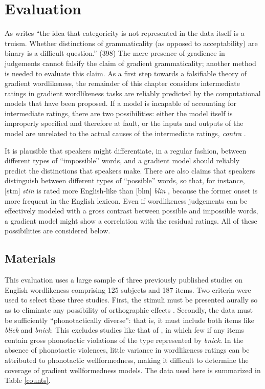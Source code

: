 \section{Evaluation}
\label{2evaluation}

As \citet{Newmeyer2007} writes ``the idea that categoricity is not represented in the data itself is a truism. Whether distinctions of grammaticality (as opposed to acceptability) are binary is a difficult question.'' (398)
The mere presence of gradience in judgements cannot falsify the claim of gradient grammaticality; another method is needed to evaluate this claim.
As a first step towards a falsifiable theory of gradient wordlikeness, the remainder of this chapter considers intermediate ratings in gradient wordlikeness tasks are reliably predicted by the computational models that have been proposed.
If a model is incapable of accounting for intermediate ratings, there are two possibilities: either the model itself is improperly specified and therefore at fault, or the inputs and outputs of the model are unrelated to the actual causes of the intermediate ratings, \emph{contra} \citet{Hayes2000}.

It is plausible that speakers might differentiate, in a regular fashion, between different types of ``impossible'' words, and a gradient model should reliably predict the distinctions that speakers make.
There are also claims that speakers distinguish between different types of ``possible'' words, so that, for instance, [stɪn] \emph{stin} is rated more English-like than [blɪn] \emph{blin} \citep[e.g.,][]{Albright2009a}, because the former onset is more frequent in the English lexicon.
Even if wordlikeness judgements can be effectively modeled with a gross contrast between possible and impossible words, a gradient model might show a correlation with the residual ratings.
All of these possibilities are considered below.

\subsection{Materials}

This evaluation uses a large sample of three previously published studies on English wordlikeness comprising 125 subjects and 187 items.
Two criteria were used to select these three studies.
First, the stimuli must be presented aurally so as to eliminate any possibility of orthographic effects \citep[e.g.,][]{Berent2001b,Berent2008b}. 
Secondly, the data must be sufficiently ``phonotactically diverse'': that is, it must include both items like \emph{blick} and \emph{bnick}. 
This excludes studies like that of \citet{Bailey2001}, in which few if any items contain gross phonotactic violations of the type represented by \emph{bnick}.
In the absence of phonotactic violences, little variance in wordlikeness ratings can be attributed to phonotactic wellformedness, making it difficult to determine the coverage of gradient wellformedness models.
The data used here is summarized in Table \ref{counts}.

